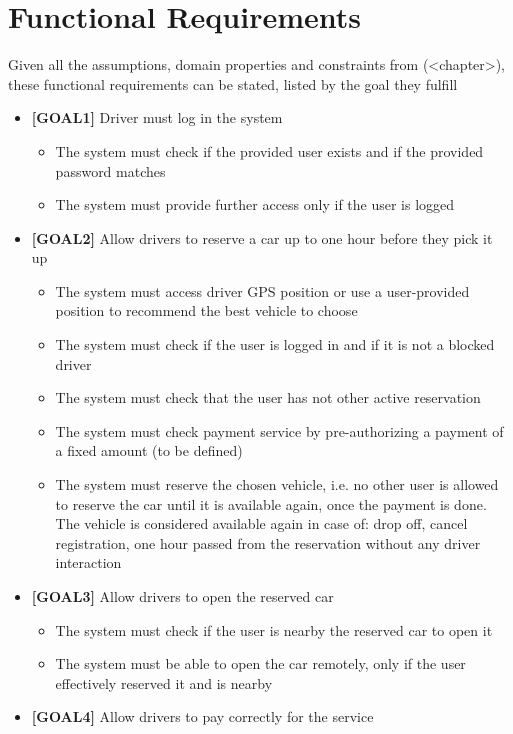 \section{Functional Requirements}

Given all the assumptions, domain properties and constraints from (<chapter>), these functional requirements can be stated, listed by the goal they fulfill

\begin{itemize}
\item \textbf{[GOAL1]} Driver must log in the system 
	\begin{itemize}
	\item The system must check if the provided user exists and if the provided password matches
	\item The system must provide further access only if the user is logged
	\end{itemize}
\item \textbf{[GOAL2]} Allow drivers to reserve a car up to one hour before they pick it up
	\begin{itemize}
	\item The system must access driver GPS position or use a user-provided position to recommend the best vehicle to choose
	\item The system must check if the user is logged in and if it is not a blocked driver
	\item The system must check that the user has not other active reservation 
	\item The system must check payment service by pre-authorizing a payment of a fixed amount (to be defined)
	\item The system must reserve the chosen vehicle, i.e. no other user is allowed to reserve the car until it is available again, once the payment is done. The vehicle is considered available again in case of: drop off, cancel registration, one hour passed from the reservation without any driver interaction
	\end{itemize}
\item \textbf{[GOAL3]} Allow drivers to open the reserved car
	\begin{itemize}
	\item The system must check if the user is nearby the reserved car to open it
	\item The system must be able to open the car remotely, only if the user effectively reserved it and is nearby
	\end{itemize}
\item \textbf{[GOAL4]} Allow drivers to pay correctly for the service

\end{itemize}
